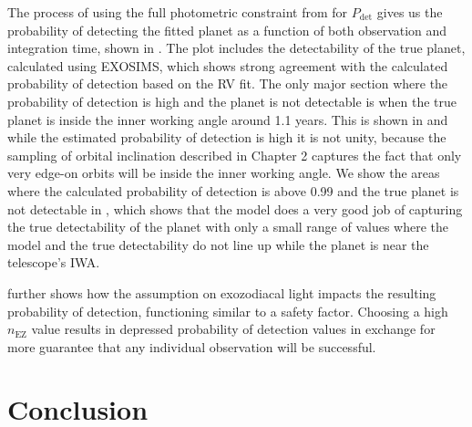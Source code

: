 The process of using the full photometric constraint from  for
$P_\textrm{det}$ gives us the probability of detecting the
fitted planet as a function of both observation and integration time, shown in
. The plot includes the detectability of
the true planet, calculated using EXOSIMS, which shows strong agreement with
the calculated probability of detection based on the RV fit. The only major
section where the probability of detection is high and the planet is not
detectable is when the true planet is inside the inner working angle around 1.1
years. This is shown in  and while the
estimated probability of detection is high it is not unity, because the
sampling of orbital inclination described in Chapter 2 captures the fact that
only very edge-on orbits will be inside the inner working angle. We show
the areas where the calculated probability of detection is above 0.99 and the
true planet is not detectable in , which
shows that the model does a very good job of capturing the true detectability
of the planet with only a small range of values where the model and the true
detectability do not line up while the planet is near the telescope's IWA.

 further shows how the assumption on
exozodiacal light impacts the resulting probability of detection, functioning
similar to a safety factor. Choosing a high $n_\textrm{EZ}$ value results in
depressed probability of detection values in exchange for more guarantee that
any individual observation will be successful.


\section{Conclusion} %
\label{sec:con_ddMag_comp}

